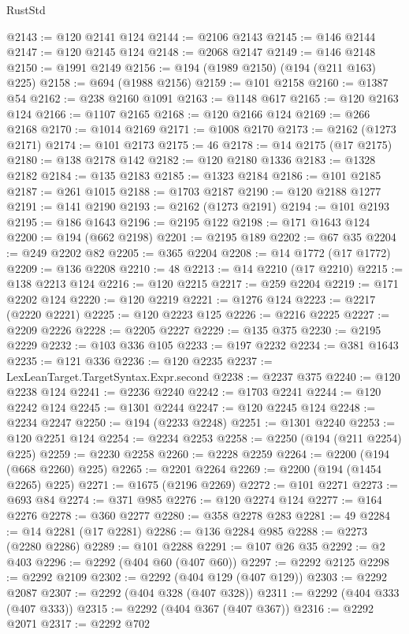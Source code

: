 \begin{lexlean}{RustStd}
\begin{coremodule}
@2143 := @120 @2141 @124
@2144 := @2106 @2143
@2145 := @146 @2144
@2147 := @120 @2145 @124
@2148 := @2068 @2147
@2149 := @146 @2148
@2150 := @1991 @2149
@2156 := @194 (@1989 @2150) (@194 (@211 @163) @225)
@2158 := @694 (@1988 @2156)
@2159 := @101 @2158
@2160 := @1387 @54
@2162 := @238 @2160 @1091
@2163 := @1148 @617
@2165 := @120 @2163 @124
@2166 := @1107 @2165
@2168 := @120 @2166 @124
@2169 := @266 @2168
@2170 := @1014 @2169
@2171 := @1008 @2170
@2173 := @2162 (@1273 @2171)
@2174 := @101 @2173
@2175 := 46
@2178 := @14 @2175 (@17 @2175)
@2180 := @138 @2178 @142
@2182 := @120 @2180 @1336
@2183 := @1328 @2182
@2184 := @135 @2183
@2185 := @1323 @2184
@2186 := @101 @2185
@2187 := @261 @1015
@2188 := @1703 @2187
@2190 := @120 @2188 @1277
@2191 := @141 @2190
@2193 := @2162 (@1273 @2191)
@2194 := @101 @2193
@2195 := @186 @1643
@2196 := @2195 @122
@2198 := @171 @1643 @124
@2200 := @194 (@662 @2198)
@2201 := @2195 @189
@2202 := @67 @35
@2204 := @249 @2202 @82
@2205 := @365 @2204
@2208 := @14 @1772 (@17 @1772)
@2209 := @136 @2208
@2210 := 48
@2213 := @14 @2210 (@17 @2210)
@2215 := @138 @2213 @124
@2216 := @120 @2215
@2217 := @259 @2204
@2219 := @171 @2202 @124
@2220 := @120 @2219
@2221 := @1276 @124
@2223 := @2217 (@2220 @2221)
@2225 := @120 @2223 @125
@2226 := @2216 @2225
@2227 := @2209 @2226
@2228 := @2205 @2227
@2229 := @135 @375
@2230 := @2195 @2229
@2232 := @103 @336 @105
@2233 := @197 @2232
@2234 := @381 @1643
@2235 := @121 @336
@2236 := @120 @2235
@2237 := LexLeanTarget.TargetSyntax.Expr.second
@2238 := @2237 @375
@2240 := @120 @2238 @124
@2241 := @2236 @2240
@2242 := @1703 @2241
@2244 := @120 @2242 @124
@2245 := @1301 @2244
@2247 := @120 @2245 @124
@2248 := @2234 @2247
@2250 := @194 (@2233 @2248)
@2251 := @1301 @2240
@2253 := @120 @2251 @124
@2254 := @2234 @2253
@2258 := @2250 (@194 (@211 @2254) @225)
@2259 := @2230 @2258
@2260 := @2228 @2259
@2264 := @2200 (@194 (@668 @2260) @225)
@2265 := @2201 @2264
@2269 := @2200 (@194 (@1454 @2265) @225)
@2271 := @1675 (@2196 @2269)
@2272 := @101 @2271
@2273 := @693 @84
@2274 := @371 @985
@2276 := @120 @2274 @124
@2277 := @164 @2276
@2278 := @360 @2277
@2280 := @358 @2278 @283
@2281 := 49
@2284 := @14 @2281 (@17 @2281)
@2286 := @136 @2284 @985
@2288 := @2273 (@2280 @2286)
@2289 := @101 @2288
@2291 := @107 @26 @35
@2292 := @2 @403
@2296 := @2292 (@404 @60 (@407 @60))
@2297 := @2292 @2125
@2298 := @2292 @2109
@2302 := @2292 (@404 @129 (@407 @129))
@2303 := @2292 @2087
@2307 := @2292 (@404 @328 (@407 @328))
@2311 := @2292 (@404 @333 (@407 @333))
@2315 := @2292 (@404 @367 (@407 @367))
@2316 := @2292 @2071
@2317 := @2292 @702

\end{coremodule}
\end{lexlean}
